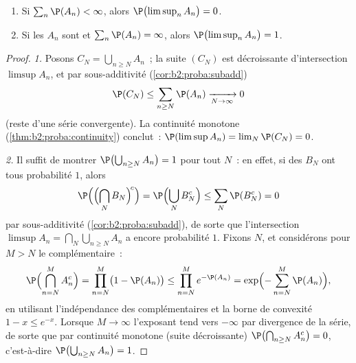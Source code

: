 \begin{theorem}\label{thm:b2:proba:borelcantelli}
\leavevmode
\begin{enumerate}
\item Si $\sum_{n} \P(A_n) < \infty$, alors
$\P\bigl(\limsup_n A_n\bigr) = 0$.
\item Si les  $A_n$ sont  et $\sum_n \P(A_n) =
\infty$, alors $\P\bigl(\limsup_n A_n\bigr) = 1$.
\end{enumerate}
\end{theorem}

\begin{proof}
\emph{1.} Posons $C_N = \bigcup_{n \geq N}A_n$~; la suite $(C_N)$
est décroissante d'intersection $\limsup A_n$, et par sous-additivité
 (\cref{cor:b2:proba:subadd})
\[
\P(C_N) \leq \sum_{n \geq N}\P(A_n)
\xrightarrow[N\to\infty]{} 0
\]
(reste d'une série convergente). La continuité monotone
(\cref{thm:b2:proba:continuity}) conclut~: $\P(\limsup A_n) =
\lim_N \P(C_N) = 0$.

\emph{2.} Il suffit de montrer $\P\bigl(\bigcup_{n\geq N}A_n\bigr)
= 1$ pour tout $N$~: en effet, si des  $B_N$ ont tous
probabilité $1$, alors
\[
\P\Bigl(\Bigl(\bigcap_NB_N\Bigr)^{\!c}\Bigr)
= \P\Bigl(\bigcup_NB_N^c\Bigr)
\leq \sum_N\P(B_N^c) = 0
\]
par sous-additivité 
(\cref{cor:b2:proba:subadd}), de sorte que l'intersection 
$\limsup A_n = \bigcap_N\bigcup_{n\geq N}A_n$ a encore
probabilité $1$. Fixons $N$, et considérons pour $M > N$ le
complémentaire~:
\[
\P\Bigl(\bigcap_{n=N}^{M} A_n^c\Bigr)
= \prod_{n=N}^{M}\bigl(1 - \P(A_n)\bigr)
\leq \prod_{n=N}^{M} e^{-\P(A_n)}
= \exp\Bigl(-\sum_{n=N}^M \P(A_n)\Bigr) ,
\]
en utilisant l'indépendance des complémentaires et la borne de convexité $1 -
x \leq e^{-x}$. Lorsque $M \to \infty$ l'exposant tend vers $-\infty$
par divergence de la série, de sorte que par continuité monotone
(suite décroissante) $\P\bigl(\bigcap_{n \geq N}A_n^c\bigr) = 0$,
c'est-à-dire $\P\bigl(\bigcup_{n \geq N}A_n\bigr) = 1$.
\end{proof}

